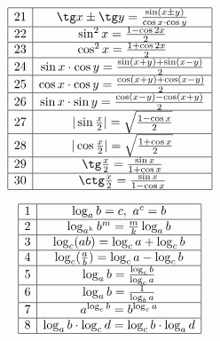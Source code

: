 \documentclass{article}
\begin{document}
\begin{displaymath}
\begin{array}{|c|c|}

  \hline
  21&\tg x \pm \tg y = \frac{\sin (x \pm y)}{\cos x \cdot \cos y}\\
  \hline
  22&\sin^2 x = \frac{1 - \cos 2x}{2}\\
  \hline
  23&\cos^2 x = \frac{1 + \cos 2x}{2}\\
  \hline
  24&\sin x \cdot \cos y = \frac{\sin (x+y) + \sin (x-y)}{2}\\
  \hline
  25&\cos x \cdot \cos y = \frac{\cos (x+y) + \cos (x-y)}{2}\\
  \hline
  26&\sin x \cdot \sin y = \frac{\cos (x-y) - \cos (x+y)}{2}\\
  \hline
  27&|\sin \frac{x}{2}| = \sqrt{\frac{1 - \cos x}{2}}\\
  \hline
  28&|\cos \frac{x}{2}| = \sqrt{\frac{1 + \cos x}{2}}\\
  \hline
  29&\tg \frac{x}{2} = \frac{\sin x}{1 + \cos x}\\
  \hline
  30&\ctg \frac{x}{2} = \frac{\sin x}{1 - \cos x}\\
  \hline
\end{array}
\end{displaymath}

\begin{displaymath}
\begin{array}{|c|c|}
  \hline
  1&\log_{a}b = c, ~ a^c = b\\
  \hline
  2&\log_{a^k}b^m = \frac{m}{k}\log_{a}b\\
  \hline
  3&\log_{c}(ab) = \log_{c}a + \log_{c}b\\
  \hline
  4&\log_{c}(\frac{a}{b}) = \log_{c}a - \log_{c}b\\
  \hline
  5&\log_{a}b = \frac{\log_{c}b}{\log_{c}a}\\
  \hline
  6&\log_{a}b = \frac{1}{\log_{b}a}\\
  \hline
  7&a^{\log_{c}b} = b^{\log_{c}a}\\
  \hline
  8&\log_{a}b \cdot \log_{c}d = \log_{c}b \cdot \log_{a}d\\
  \hline
\end{array}
\end{displaymath}
\end{document}
